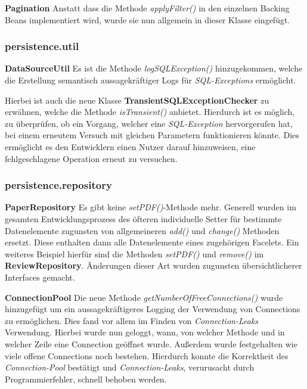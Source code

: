 \textbf{Pagination} Anstatt dass die Methode \emph{applyFilter()} in den einzelnen Backing Beans implementiert wird, wurde sie nun allgemein in dieser Klasse eingefügt.

\subsubsection{persistence.util}

\textbf{DataSourceUtil} Es ist die Methode \emph{logSQLException()} hinzugekommen, welche die Erstellung
semantisch aussagekräftiger Logs für \emph{SQL-Exceptions} ermöglicht.

Hierbei ist auch die neue Klasse \textbf{TransientSQLExceptionChecker} zu erwähnen, welche
die Methode \emph{isTransient()} anbietet.
Hierdurch ist es möglich, zu überprüfen, ob ein Vorgang,
welcher eine \emph{SQL-Exception} hervorgerufen hat, bei einem erneutem Versuch
mit gleichen Parametern funktionieren könnte.
Dies ermöglicht es den Entwicklern einen Nutzer darauf hinzuweisen,
eine fehlgeschlagene Operation erneut zu versuchen.

\subsubsection{persistence.repository}

\textbf{PaperRepository} Es gibt keine \emph{setPDF()}-Methode mehr.
Generell wurden im gesamten Entwicklungsprozess des öfteren individuelle Setter für
bestimmte Datenelemente zugunsten von allgemeineren \emph{add()} und \emph{change()} Methoden ersetzt.
Diese enthalten dann alle Datenelemente eines zugehörigen Facelets.
Ein weiteres Beispiel hierfür sind die Methoden \emph{setPDF()} und \emph{remove()}
im \textbf{ReviewRepository}.
Änderungen dieser Art wurden zugunsten übersichtlicherer Interfaces gemacht.

\textbf{ConnectionPool} Die neue Methode \emph{getNumberOfFreeConnections()}
wurde hinzugefügt um ein aussagekräftigeres Logging der Verwendung von Connections
zu ermöglichen.
Dies fand vor allem im Finden von \emph{Connection-Leaks} Verwendung.
Hierbei wurde nun geloggt, wann, von welcher Methode und in welcher Zeile eine
Connection geöffnet wurde.
Außerdem wurde festgehalten wie viele offene Connections noch bestehen.
Hierdurch konnte die Korrektheit des \emph{Connection-Pool} bestätigt
und \emph{Connection-Leaks}, verurusacht durch Programmierfehler,
schnell behoben werden.

